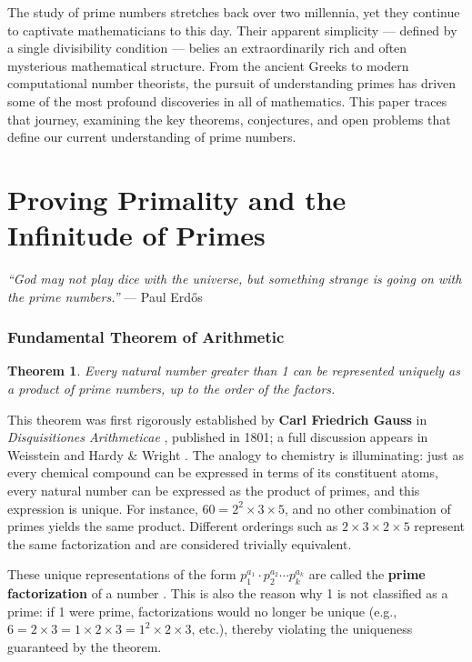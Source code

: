 \documentclass[11pt]{article}
\theoremstyle{plain}
\newtheorem{theorem}{Theorem}
\theoremstyle{definition}
\theoremstyle{remark}
\begin{document}
\par The study of prime numbers stretches back over two millennia, yet they continue to captivate mathematicians to this day. Their apparent simplicity — defined by a single divisibility condition — belies an extraordinarily rich and often mysterious mathematical structure. From the ancient Greeks to modern computational number theorists, the pursuit of understanding primes has driven some of the most profound discoveries in all of mathematics. This paper traces that journey, examining the key theorems, conjectures, and open problems that define our current understanding of prime numbers.

\section{Proving Primality and the Infinitude of Primes}

\par \textit{``God may not play dice with the universe, but something strange is going on with the prime numbers.''} \hfill --- Paul Erd\H{o}s \cite{erdos_quote}

\bigskip

\subsubsection{Fundamental Theorem of Arithmetic}
\begin{theorem}
	\label{thm:ftathm}
	Every natural number greater than 1 can be represented uniquely as a product of prime numbers, up to the order of the factors.
\end{theorem}

\par This theorem was first rigorously established by \textbf{Carl Friedrich Gauss} in \textit{Disquisitiones Arithmeticae} \cite{gauss_disquisitiones_1801}, published in 1801; a full discussion appears in Weisstein \cite{weisstein_fta} and Hardy \& Wright \cite{hardy_intro_1979}. The analogy to chemistry is illuminating: just as every chemical compound can be expressed in terms of its constituent atoms, every natural number can be expressed as the product of primes, and this expression is unique. For instance, $60 = 2^2 \times 3 \times 5$, and no other combination of primes yields the same product. Different orderings such as $2 \times 3 \times 2 \times 5$ represent the same factorization and are considered trivially equivalent.

\par These unique representations of the form $p_1^{a_1} \cdot p_2^{a_2} \cdots p_k^{a_k}$ are called the \textbf{prime factorization} of a number \cite{cuemath_primefact}. This is also the reason why 1 is not classified as a prime: if 1 were prime, factorizations would no longer be unique (e.g., $6 = 2 \times 3 = 1 \times 2 \times 3 = 1^2 \times 2 \times 3$, etc.), thereby violating the uniqueness guaranteed by the theorem.
\end{document}
